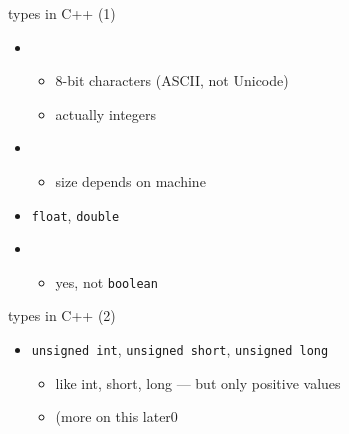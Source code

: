 \begin{frame}{types in C++ (1)}
\begin{itemize}
\item {}
    \begin{itemize}
    \item<2-> 8-bit characters (ASCII, not Unicode)
    \item<2-> actually integers
    \end{itemize}
\item {}
    \begin{itemize}
    \item <3->size depends on machine
    \end{itemize}
\item \texttt{float}, \texttt{double}
\item {}
    \begin{itemize}
    \item<4-> yes, not \texttt{boolean}
    \end{itemize}
\end{itemize}
\end{frame}

\begin{frame}{types in C++ (2)}
\begin{itemize}
\item \texttt{unsigned int}, \texttt{unsigned short}, \texttt{unsigned long}
    \begin{itemize}
    \item like int, short, long --- but only positive values
    \item (more on this later0
    \end{itemize}
\end{itemize}
\end{frame}

